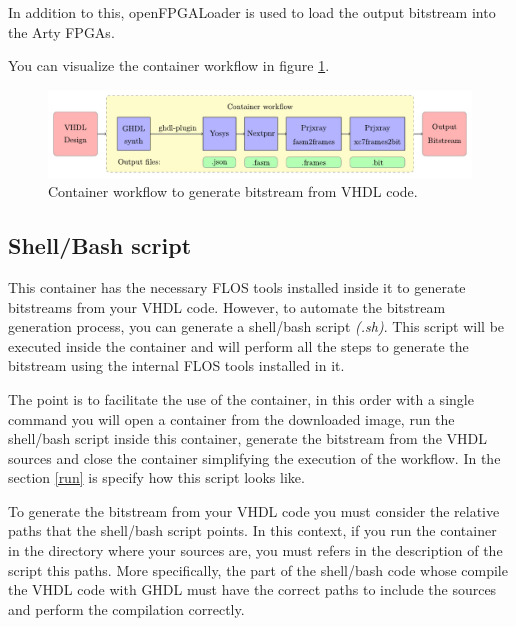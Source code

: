 \noindent In addition to this, openFPGALoader \cite{gh:openFPGALoader} is used to load the output bitstream into the Arty FPGAs.

\vspace{5mm}

\noindent You can visualize the container workflow in figure \ref{fig:workf}. 

\begin{figure}[H]
    \centering
    \includegraphics[width=151mm]{figures/container_workflow.pdf}
    \caption{Container workflow to generate bitstream from VHDL code.}
    \label{fig:workf}
\end{figure}

\subsection{Shell/Bash script}

\label{shell:script}

This container has the necessary FLOS tools installed inside it to generate bitstreams from your VHDL code. 
However, to automate the bitstream generation process, you can generate a shell/bash script \textit{(.sh)}.
This script will be executed inside the container and will perform all the steps to generate the bitstream using the internal FLOS tools installed in it.

\vspace{5mm}

\noindent The point is to facilitate the use of the container, in this order with a single command you will open a container from the downloaded image, run the shell/bash script inside this container, generate the bitstream from the VHDL sources and close the container simplifying the execution of the workflow.
In the section \ref{run} is specify how this script looks like.

\vspace{5mm}

\noindent To generate the bitstream from your VHDL code you must consider the relative paths that the shell/bash script points. 
In this context, if you run the container in the directory where your sources are, you must refers in the description of the script this paths.
More specifically, the part of the shell/bash code whose compile the VHDL code with GHDL must have the correct paths to include the sources and perform the compilation correctly.

